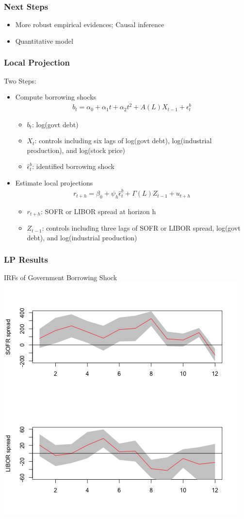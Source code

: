 \documentclass[10pt]{beamer}
\begin{document}
\begin{frame}
\frametitle{Next Steps}
\begin{itemize}
\item More robust empirical evidences; Causal inference
\item Quantitative model
\end{itemize}
\end{frame}



\begin{frame}
  \frametitle{Local Projection}
Two Steps:
\begin{itemize}
  \item Compute borrowing shocks
  \begin{align*}
    b_t=\alpha_0+\alpha_1t+\alpha_2t^2+A(L)X_{t-1}+\epsilon_t^b
  \end{align*}
  \begin{itemize}
    \item $b_t$: log(govt debt)
    \item $X_t$: controls including six lags of log(govt debt), log(industrial production), and log(stock price)
    \item $\hat{\epsilon}_t^b$: identified borrowing shock
  \end{itemize}
  \item Estimate local projections
  \begin{align*}
    r_{t+h}=\beta_0+\psi_h \hat{\epsilon}_t^b +\Gamma(L)Z_{t-1}+u_{t+h}
  \end{align*}
    \begin{itemize}
      \item $r_{t+h}$: SOFR or LIBOR spread at horizon h
      \item $Z_{t-1}$: controls including three lags of SOFR or LIBOR spread, log(govt debt), and log(industrial production)
    \end{itemize}
\end{itemize}
\end{frame}


\begin{frame}
  \frametitle{LP Results}
  \begin{center}
    IRFs of Government Borrowing Shock
    \includegraphics[scale=0.5]{irfs.png}
  \end{center}
\end{frame}
\end{document}
